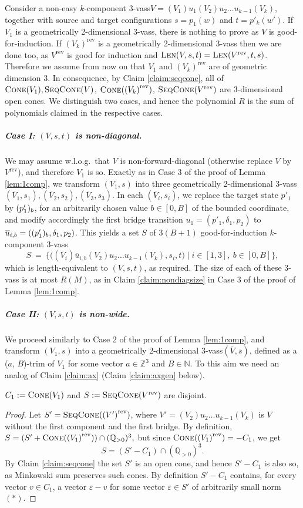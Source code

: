 \documentclass[a4paper, UKenglish, cleveref, autoref, thm-restate]{lipics-v2021}
\newcommand{\N}{\mathbb{N}}
\newcommand{\Z}{\mathbb{Z}}
\newcommand{\Q}{\mathbb{Q}}
\newcommand{\Qpos}{\Q_{>0}}
\newcommand{\set}[1]{\{#1\}}
\newcommand{\setof}[2]{\set{#1 \mid #2}}
\newcommand{\Len}[3]{\textsc{Len}(#1, #2, #3)}
\newcommand{\mytrim}[2]{(#1, #2)-trim}
\newcommand{\vass}{{\sc vass}\xspace}
\newcommand{\tvass}{\parvass 3}
\newcommand{\geomvass}{geometrically 2-dimensional \tvass}
\newcommand{\parvass}[1]{{$#1$-\vass}\xspace}
\newcommand{\ktvass}{(V_1) u_1 (V_2) u_2 \ldots u_{k-1} (V_k)}
\newcommand{\ktvasstwo}{(V_2) u_2 \ldots u_{k-1} (V_k)}
\newcommand{\ktvassmod}{(\essdvass V_i) \essdvass u_{i, b} (V_2) u_2 \ldots u_{k-1} (V_k)}
\newcommand{\para}[1]{\vspace{-3mm}\subparagraph*{\bf #1.}}
\newcommand{\setfromto}[2]{[#1, #2]}
\newcommand{\setto}[1]{\setfromto 1 {#1}}
\newcommand{\mywlog}{w.l.o.g.~}
\newcommand{\rev}[1]{{#1}^{\text{rev}}}
\newcommand{\cone}[1]{\textsc{Cone}(#1)}
\newcommand{\seqcone}[1]{\textsc{SeqCone}(#1)}
\newcommand{\essdvass}[1]{\overline{#1}}
\begin{document}
\begin{appendixproof}
Consider a non-easy $k$-component \tvass $V = \ktvass$, together with
source and target configurations $s = p_1(w)$ and $t=p'_k(w')$.
If $V_1$  is a \geomvass, there is nothing to prove as $V$ is good-for-induction.
If $\rev{(V_k)}$ is a \geomvass then we are done too, as $\rev V$ is good for induction and 
$\Len V s t = \Len{\rev V} t s$.
Therefore we assume from now on that $V_1$ and $\rev{(V_k)}$ are of geometric dimension 3. 
In consequence, by Claim \ref{claim:seqcone}, all of $\cone {V_1}, \seqcone V$, $\cone{\rev{(V_k)}}$, $\seqcone{\rev V}$ are
3-dimensional open cones.
We distinguish two cases, and hence the polynomial $R$ is the sum of polynomials claimed
in the respective cases.

\para{Case I: $(V, s, t)$ is non-diagonal}
We may assume \mywlog that $V$ is non-forward-diagonal (otherwise replace $V$ by $\rev V$),
and therefore $V_1$ is so.
Exactly as in Case 3 of the proof of Lemma \ref{lem:1comp}, we transform
$(V_1,s)$ into
three \geomvass $(\essdvass V_1, s_1), (\essdvass V_2, s_2), (\essdvass V_3, s_3)$.
In each $(\essdvass V_i, s_i)$, we replace the target state $p'_1$ by
$(p'_1)_{b}$, for an arbitrarily chosen value $b\in\setfromto 0 B$ of the bounded coordinate,
and modify accordingly the first bridge transition $u_1 = (p'_1, \delta_1, p_2)$ to 
$\essdvass u_{i, b} = (\pair{(p'_1)} b, \delta_1, p_2)$.
This yields a set $S$ of $3(B+1)$ good-for-induction $k$-component \tvass  
\[
S \ = \ \setof{\big(\ktvassmod, s_i, t \big)}{i\in\setto 3, \ b\in \setfromto 0 B},
\]
which is length-equivalent to $(V, s, t)$, as required. 
The size of each of these \tvass is
at most $R(M)$, as in Claim \ref{claim:nondiagsize} in Case 3 of the proof of Lemma \ref{lem:1comp}.

\para{Case II: $(V, s, t)$ is non-wide}
We proceed similarly to Case 2 of the proof of Lemma \ref{lem:1comp}, and transform
$(V_1,s)$ into a \geomvass $(\essdvass V, \essdvass s)$, defined as a \mytrim {$a$} {$B$} of $V_1$
for some vector $a\in\Z^3$ and $B\in\N$.
To this aim we need an analog of Claim \ref{claim:ax} (Claim \ref{claim:axgen} below).
\begin{claim}\label{claim:empty_intersection}
$C_1 :=  \cone{V_1}$ and $S := \seqcone{\rev V}$ are disjoint.
\end{claim}

\begin{proof}
Let $S'=\seqcone {\rev{(V')}}$, where $V'=\ktvasstwo$ is $V$ without the first component and the first bridge.
By definition, 
$
S = (S' + \cone{\rev{(V_1)}})\cap(\Qpos)^3,
$
but since $\cone{\rev{(V_1)}} = -C_1$, we get
\[
S = (S' - C_1)\cap(\Qpos)^3.
\]
By Claim \ref{claim:seqcone} the set $S'$ is an open cone, and hence
$S' - C_1$ is also so, as Minkowski sum preserves such cones.
By definition $S' - C_1$ contains, for every vector $v\in C_1$, 
a vector $\varepsilon-v$ for some vector $\varepsilon\in S'$ of arbitrarily small norm $(*)$.


\end{proof}
\end{appendixproof}
\end{document}
